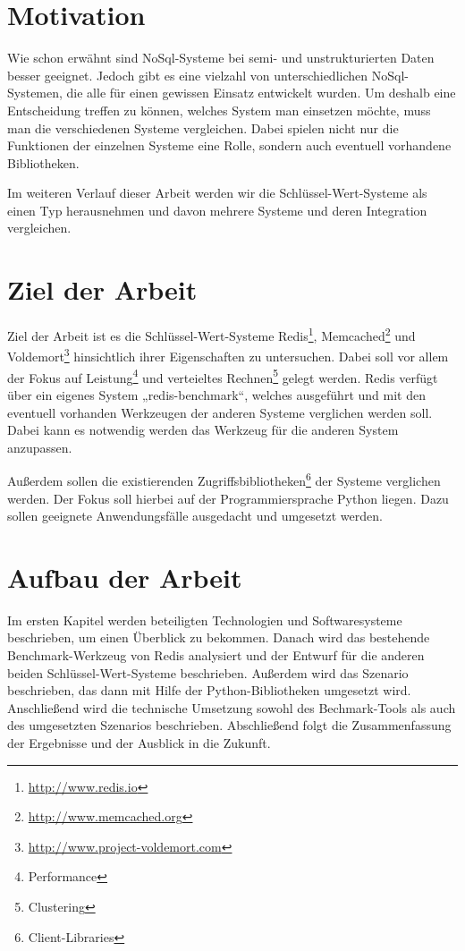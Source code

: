 \section{Motivation}
Wie schon erwähnt sind NoSql-Systeme bei semi- und unstrukturierten Daten besser
geeignet. Jedoch gibt es eine vielzahl von unterschiedlichen NoSql-Systemen,
die alle für einen gewissen Einsatz entwickelt wurden. Um deshalb eine
Entscheidung treffen zu können, welches System man einsetzen möchte, muss man
die verschiedenen Systeme vergleichen. Dabei spielen nicht nur die Funktionen
der einzelnen Systeme eine Rolle, sondern auch eventuell vorhandene
Bibliotheken.

Im weiteren Verlauf dieser Arbeit werden wir die Schlüssel-Wert-Systeme als einen
Typ herausnehmen und davon mehrere Systeme und deren Integration vergleichen.

\section{Ziel der Arbeit}
Ziel der Arbeit ist es die Schlüssel-Wert-Systeme
Redis\footnote{\url{http://www.redis.io}},
Memcached\footnote{\url{http://www.memcached.org}} und
Voldemort\footnote{\url{http://www.project-voldemort.com}} hinsichtlich ihrer
Eigenschaften zu untersuchen. Dabei soll vor allem der Fokus auf
Leistung\footnote{Performance} und verteieltes Rechnen\footnote{Clustering}
gelegt werden. Redis verfügt über ein eigenes System „redis-benchmark“, welches
ausgeführt und mit den eventuell vorhanden Werkzeugen der anderen Systeme
verglichen werden soll. Dabei kann es notwendig werden das Werkzeug für die
anderen System anzupassen.

Außerdem sollen die existierenden
Zugriffsbibliotheken\footnote{Client-Libraries} der Systeme verglichen
werden. Der Fokus soll hierbei auf der Programmiersprache Python liegen. Dazu
sollen geeignete Anwendungsfälle ausgedacht und umgesetzt werden.

\section{Aufbau der Arbeit}
Im ersten Kapitel werden beteiligten Technologien und Softwaresysteme
beschrieben, um einen Überblick zu bekommen. Danach wird das bestehende
Benchmark-Werkzeug von Redis analysiert und der Entwurf für die anderen beiden
Schlüssel-Wert-Systeme beschrieben. Außerdem wird das Szenario beschrieben, das
dann mit Hilfe der Python-Bibliotheken umgesetzt wird. Anschließend wird die
technische Umsetzung sowohl des Bechmark-Tools als auch des umgesetzten
Szenarios beschrieben. Abschließend folgt die Zusammenfassung der Ergebnisse
und der Ausblick in die Zukunft.
